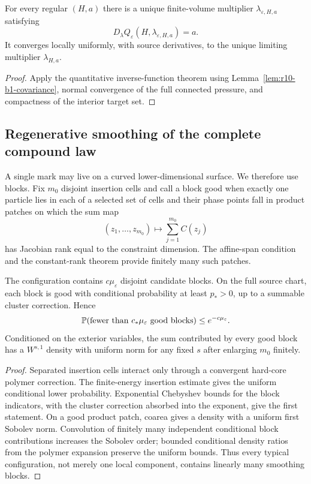 \begin{corollary}
\label{cor:r10-b1-saddle}
For every regular \((H,a)\) there is a unique finite-volume multiplier
\(\lambda_{\varepsilon,H,a}\) satisfying
\[
 D_\lambda Q_\varepsilon(H,\lambda_{\varepsilon,H,a})=a.
\]
It converges locally uniformly, with source derivatives, to the unique
limiting multiplier \(\lambda_{H,a}\).
\end{corollary}

\begin{proof}
Apply the quantitative inverse-function theorem using
Lemma~\ref{lem:r10-b1-covariance}, normal convergence of the full connected
pressure, and compactness of the interior target set.
\end{proof}

\subsection{Regenerative smoothing of the complete compound law}

A single mark may live on a curved lower-dimensional surface.  We therefore
use blocks.  Fix \(m_0\) disjoint insertion cells and call a block good when
exactly one particle lies in each of a selected set of cells and their phase
points fall in product patches on which the sum map
\[
 (z_1,\ldots,z_{m_0})\longmapsto\sum_{j=1}^{m_0}C(z_j)
\]
has Jacobian rank equal to the constraint dimension.  The affine-span
condition and the constant-rank theorem provide finitely many such patches.

\begin{lemma}
\label{lem:r10-b1-goodblocks}
The configuration contains \(c\mu_\varepsilon\) disjoint candidate blocks.
On the full source chart, each block is good with conditional probability at
least \(p_*>0\), up to a summable cluster correction.  Hence
\[
 \mathbb P(\hbox{fewer than }c_*\mu_\varepsilon
 \hbox{ good blocks})\le e^{-c\mu_\varepsilon}.
\]
Conditioned on the exterior variables, the sum contributed by every good block
has a \(W^{s,1}\) density with uniform norm for any fixed \(s\) after enlarging
\(m_0\) finitely.
\end{lemma}

\begin{proof}
Separated insertion cells interact only through a convergent hard-core
polymer correction.  The finite-energy insertion estimate gives the uniform
conditional lower probability.  Exponential Chebyshev bounds for the block
indicators, with the cluster correction absorbed into the exponent, give the
first statement.  On a good product patch, coarea gives a density with a
uniform first Sobolev norm.  Convolution of finitely many independent
conditional block contributions increases the Sobolev order; bounded
conditional density ratios from the polymer expansion preserve the uniform
bounds.  Thus every typical configuration, not merely one local component,
contains linearly many smoothing blocks.
\end{proof}

